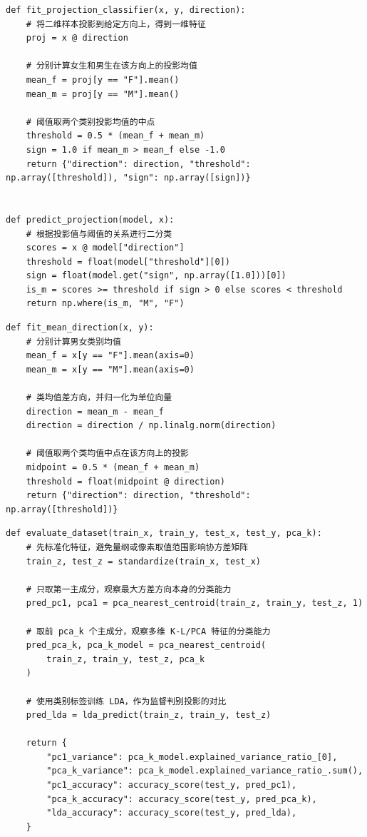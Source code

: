 \documentclass[UTF8,a4paper,12pt]{ctexart}
\begin{document}
\begin{lstlisting}[caption={Exp.3 projection classifier},label={lst:exp3-projection}]
def fit_projection_classifier(x, y, direction):
    # 将二维样本投影到给定方向上，得到一维特征
    proj = x @ direction

    # 分别计算女生和男生在该方向上的投影均值
    mean_f = proj[y == "F"].mean()
    mean_m = proj[y == "M"].mean()

    # 阈值取两个类别投影均值的中点
    threshold = 0.5 * (mean_f + mean_m)
    sign = 1.0 if mean_m > mean_f else -1.0
    return {"direction": direction, "threshold": np.array([threshold]), "sign": np.array([sign])}


def predict_projection(model, x):
    # 根据投影值与阈值的关系进行二分类
    scores = x @ model["direction"]
    threshold = float(model["threshold"][0])
    sign = float(model.get("sign", np.array([1.0]))[0])
    is_m = scores >= threshold if sign > 0 else scores < threshold
    return np.where(is_m, "M", "F")
\end{lstlisting}

\begin{lstlisting}[caption={Exp.3 mean-difference direction},label={lst:exp3-mean-direction}]
def fit_mean_direction(x, y):
    # 分别计算男女类别均值
    mean_f = x[y == "F"].mean(axis=0)
    mean_m = x[y == "M"].mean(axis=0)

    # 类均值差方向，并归一化为单位向量
    direction = mean_m - mean_f
    direction = direction / np.linalg.norm(direction)

    # 阈值取两个类均值中点在该方向上的投影
    midpoint = 0.5 * (mean_f + mean_m)
    threshold = float(midpoint @ direction)
    return {"direction": direction, "threshold": np.array([threshold])}
\end{lstlisting}

\begin{lstlisting}[caption={Exp.3 extended datasets: PCA feature extraction},label={lst:exp3-extended}]
def evaluate_dataset(train_x, train_y, test_x, test_y, pca_k):
    # 先标准化特征，避免量纲或像素取值范围影响协方差矩阵
    train_z, test_z = standardize(train_x, test_x)

    # 只取第一主成分，观察最大方差方向本身的分类能力
    pred_pc1, pca1 = pca_nearest_centroid(train_z, train_y, test_z, 1)

    # 取前 pca_k 个主成分，观察多维 K-L/PCA 特征的分类能力
    pred_pca_k, pca_k_model = pca_nearest_centroid(
        train_z, train_y, test_z, pca_k
    )

    # 使用类别标签训练 LDA，作为监督判别投影的对比
    pred_lda = lda_predict(train_z, train_y, test_z)

    return {
        "pc1_variance": pca_k_model.explained_variance_ratio_[0],
        "pca_k_variance": pca_k_model.explained_variance_ratio_.sum(),
        "pc1_accuracy": accuracy_score(test_y, pred_pc1),
        "pca_k_accuracy": accuracy_score(test_y, pred_pca_k),
        "lda_accuracy": accuracy_score(test_y, pred_lda),
    }
\end{lstlisting}
\end{document}
